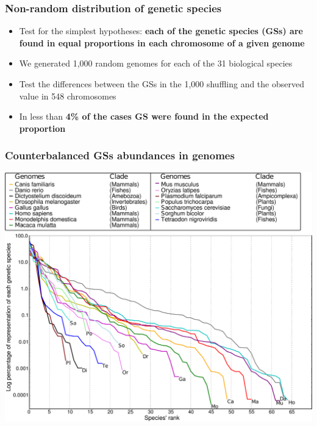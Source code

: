 \documentclass[hyperref={pagebackref=true},table]{beamer}
\begin{document}
\begin{frame}
  \frametitle{Non-random distribution of genetic species}
  \begin{itemize}
  \item Test for the simplest hypotheses: \textbf{each of the genetic species (GSs) are found in equal proportions in each chromosome of a given genome}
  \item<2-> We generated 1,000 random genomes for each of the 31 biological species
  \item<3-> Test the differences between the GSs in the 1,000 shuffling and the observed value in 548 chromosomes
  \item<4-> In less than \textbf{4\% of the cases GS were found in the expected proportion}
  \end{itemize}
\end{frame}

\begin{frame}
  \frametitle{Counterbalanced GSs abundances in genomes}
  \begin{center}
   \includegraphics[height=.8\textheight]{pictures/untbgen/SAD_genomes.pdf}
  \end{center}
\end{frame}
\end{document}
